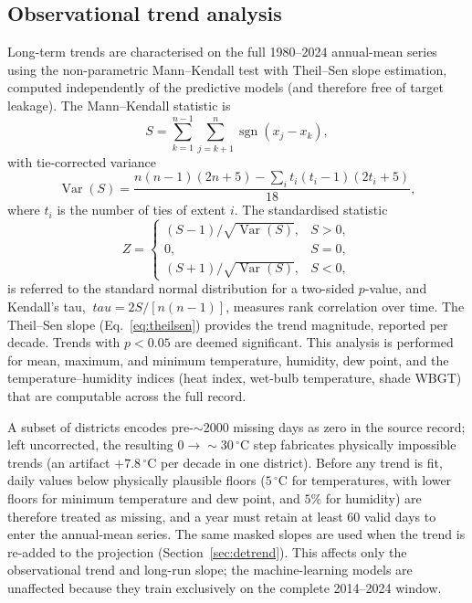 \documentclass[pdflatex,sn-basic,lineno]{sn-jnl}
\newcommand{\degC}{\ensuremath{^{\circ}\mathrm{C}}}
\begin{document}
\subsection{Observational trend analysis}\label{sec:trend}
Long-term trends are characterised on the full 1980--2024 annual-mean series
using the non-parametric Mann--Kendall test with Theil--Sen slope estimation,
computed independently of the predictive models (and therefore free of target
leakage). The Mann--Kendall statistic is
\begin{equation}
S=\sum_{k=1}^{n-1}\sum_{j=k+1}^{n}\operatorname{sgn}(x_j-x_k),
\end{equation}
with tie-corrected variance
\begin{equation}
\operatorname{Var}(S)=\frac{n(n-1)(2n+5)-\sum_{i} t_i(t_i-1)(2t_i+5)}{18},
\end{equation}
where $t_i$ is the number of ties of extent $i$. The standardised statistic
\begin{equation}
Z=\begin{cases}
(S-1)/\sqrt{\operatorname{Var}(S)}, & S>0,\\
0, & S=0,\\
(S+1)/\sqrt{\operatorname{Var}(S)}, & S<0,
\end{cases}
\end{equation}
is referred to the standard normal distribution for a two-sided $p$-value, and
Kendall's tau, $\ tau = 2S/[n(n-1)]$, measures rank correlation over time. The Theil--Sen
slope (Eq.~\ref{eq:theilsen}) provides the trend magnitude, reported per decade.
Trends with $p<0.05$ are deemed significant. This analysis is performed for mean,
maximum, and minimum temperature, humidity, dew point, and the
temperature--humidity indices (heat index, wet-bulb temperature, shade WBGT)
that are computable across the full record.

A subset of districts encodes pre-$\sim$2000 missing days as zero in the source
record; left uncorrected, the resulting $0\rightarrow\sim\!30\,\degC$ step
fabricates physically impossible trends (an artifact $+7.8\,\degC$ per decade
in one district). Before any trend is fit, daily values below physically
plausible floors ($5\,\degC$ for temperatures, with lower floors for minimum
temperature and dew point, and $5\%$ for humidity) are therefore treated as
missing, and a year must retain at least 60 valid days to enter the annual-mean
series. The same masked slopes are used when the trend is re-added to the
projection (Section~\ref{sec:detrend}). This affects only the observational
trend and long-run slope; the machine-learning models are unaffected because they
train exclusively on the complete 2014--2024 window.
\end{document}
